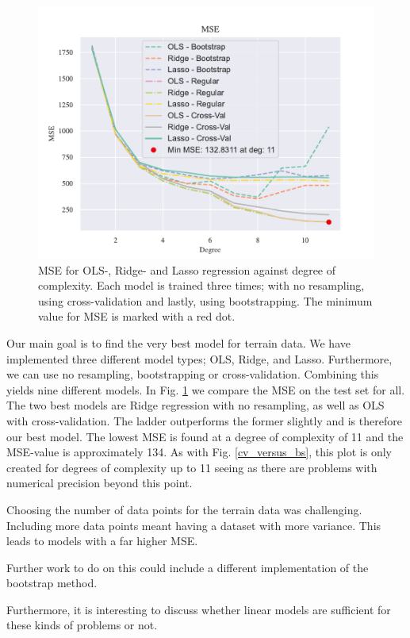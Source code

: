 \begin{figure}[h!]
    \centering
    \includegraphics[width=1\linewidth]{project_1_alt/figures/figures_in_report/All_Terrain.pdf}
    \caption{MSE for OLS-, Ridge- and Lasso regression against degree of complexity. Each model is trained three times; with no resampling, using cross-validation and lastly, using bootstrapping. The minimum value for MSE is marked with a red dot.}
    \label{all_terrain}
\end{figure}

Our main goal is to find the very best model for terrain data. We have implemented three different model types; OLS, Ridge, and Lasso. Furthermore, we can use no resampling, bootstrapping or cross-validation. Combining this yields nine different models. In Fig. \ref{all_terrain} we compare the MSE on the test set for all. The two best models are Ridge regression with no resampling, as well as OLS with cross-validation. The ladder outperforms the former slightly and is therefore our best model. The lowest MSE is found at a degree of complexity of 11 and the MSE-value is approximately 134. As with Fig. \ref{cv_versus_bs}, this plot is only created for degrees of complexity up to 11 seeing as there are problems with numerical precision beyond this point. 


Choosing the number of data points for the terrain data was challenging. Including more data points meant having a dataset with more variance. This leads to models with a far higher MSE. 

Further work to do on this could include a different implementation of the bootstrap method.

Furthermore, it is interesting to discuss whether linear models are sufficient for these kinds of problems or not. 


